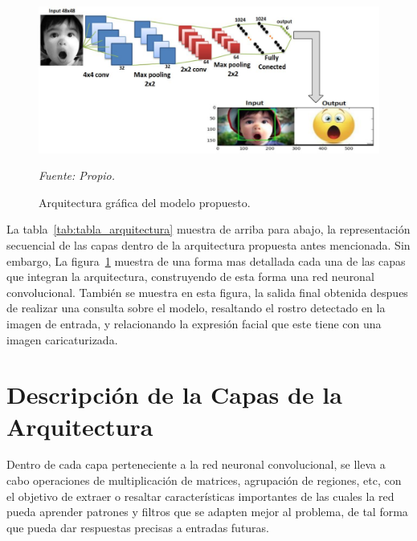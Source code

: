 \begin{figure}[H]
		\centering
		\includegraphics[width=180mm]{Imagenes/arquitectura_CNN_grafico.pdf}
		\caption{Arquitectura gráfica del modelo propuesto.}
		\vspace{0.15cm}
		\textit{Fuente: Propio.}
		\label{fig:arquitectura_CNN_grafico}
\end{figure}

La tabla~\ref{tab:tabla_arquitectura} muestra de arriba para abajo, la representación secuencial de las capas dentro de la arquitectura propuesta antes mencionada. Sin embargo, La figura~\ref{fig:arquitectura_CNN_grafico} muestra de una forma mas detallada cada una de las capas que integran la arquitectura, construyendo de esta forma una red neuronal convolucional. También se muestra en esta figura, la salida final obtenida despues de realizar una consulta sobre el modelo, resaltando el rostro detectado en la imagen de entrada, y relacionando la expresión facial que este tiene con una imagen caricaturizada.

\section{Descripción de la Capas de la Arquitectura}

Dentro de cada capa perteneciente a la red neuronal convolucional, se lleva a cabo operaciones de multiplicación de matrices, agrupación de regiones, etc, con el objetivo de extraer o resaltar características importantes de las cuales la red pueda aprender patrones y filtros que se adapten mejor al problema, de tal forma que pueda dar respuestas precisas a entradas futuras. 

